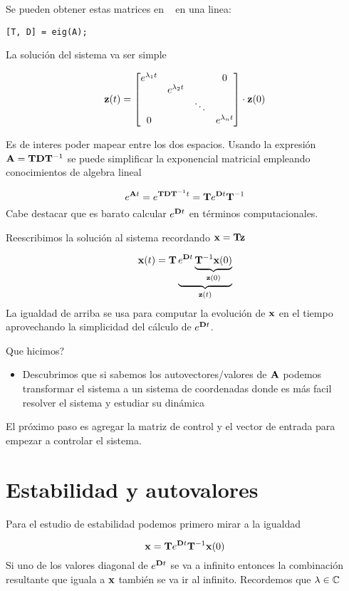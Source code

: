 \documentclass[11pt, a4paper, twoside, openright, openany]{book}
\newcommand{\dimss}{\dimfont{n}}
\begin{document}
Se pueden obtener estas matrices en \Matlab~ en una linea:
\begin{lstlisting}
[T, D] = eig(A);
\end{lstlisting}

La solución del sistema va ser simple

\[
\Cme{z}(t) = \begin{bmatrix}
e^{\lambda_1 t} & & & 0 \\
 &e^{\lambda_2 t}& &  \\
 & &\ddots &  \\
  0& & & e^{\lambda_\dimss t} \\
\end{bmatrix} \cdot \Cme{z}(0)
\]

Es de interes poder mapear entre los dos espacios. Usando la expresión \( \mathbf{A} = \mathbf{T} \mathbf{D} \mathbf{T}^{-1}\) se puede simplificar la exponencial matricial empleando conocimientos de algebra lineal

\[
e^{\mathbf{A}t} = e^{\mathbf{T} \mathbf{D} \mathbf{T}^{-1}t} = \mathbf{T} e^{\mathbf{D}t} \mathbf{T}^{-1}
\]
Cabe destacar que es barato calcular \( e^{\mathbf{D}t}\) en términos computacionales. 

Reescribimos la solución al sistema recordando \(\mathbf{x} = \mathbf{T}\mathbf{z}\)

\[
\mathbf{x}(t) = \mathbf{T}  \underbrace{e^{\mathbf{D}t} \underbrace{\mathbf{T}^{-1} \mathbf{x}(0)}_{\mathbf{z}(0)}}_{\mathbf{z}(t)}
\]
La igualdad de arriba se usa para computar la evolución de $\mathbf{x}$ en el tiempo aprovechando la simplicidad del cálculo de \(e^{\mathbf{D}t}\). 

Que hicimos?
\begin{itemize}
	\item Descubrimos que si sabemos los autovectores/valores de \(\mathbf{A}\) podemos transformar el sistema a un sistema de coordenadas donde es más facil resolver el sistema y estudiar su dinámica
\end{itemize}
 
El próximo paso es agregar la matriz de control y el vector de entrada para empezar a controlar el sistema.

\chapter{Estabilidad y autovalores}


Para el estudio de estabilidad podemos primero mirar a la igualdad

 \[
\mathbf{x} = \mathbf{T} e^{\mathbf{D}t} \mathbf{T}^{-1} \mathbf{x}(0)
\]
Si uno de los valores diagonal de $e^{\mathbf{D}t}$ se va a infinito entonces la combinación resultante que iguala a \(\mathbf{x}\) también se va ir al infinito. Recordemos que $\lambda \in \Bbb{C}$
\end{document}
